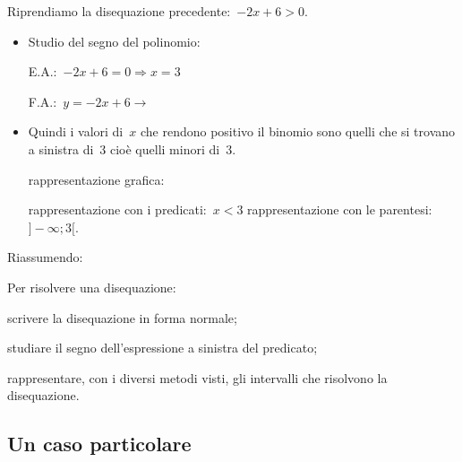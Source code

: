  \begin{esempio}
Riprendiamo la disequazione precedente:~$-2 x +6 > 0$.
\begin{itemize} [noitemsep]
 \item Studio del segno del polinomio: \\
 \begin{minipage}{.45\textwidth}
  E.A.:~$-2 x +6=0 \Rightarrow  x=3$
 \end{minipage}
 \begin{minipage}{.25\textwidth}
  F.A.:~$y=-2 x +6 \rightarrow $
 \end{minipage}
 \begin{minipage}{.3\textwidth}
  
 \end{minipage}
 \item Quindi i valori di~$x$ che rendono positivo il binomio sono quelli che
si trovano a sinistra di~3 cioè quelli minori di~3.
 \subitem
  \begin{minipage}{.35\textwidth}
   rappresentazione grafica:
  \end{minipage}
  \begin{minipage}{.30\textwidth}
   
  \end{minipage}
 \subitem rappresentazione con i predicati:~$x < 3$
 \subitem rappresentazione con le parentesi:~$]-∞; 3[$.
\end{itemize}
 \end{esempio}

Riassumendo:

\begin{procedura}
 Per risolvere una disequazione:
\begin{enumeratea}
 \item scrivere la disequazione in forma normale;
 \item studiare il segno dell'espressione a sinistra del predicato;
 \item rappresentare, con i diversi metodi visti,
  gli intervalli che risolvono la disequazione.
\end{enumeratea}
\end{procedura}

\subsection{Un caso particolare}


